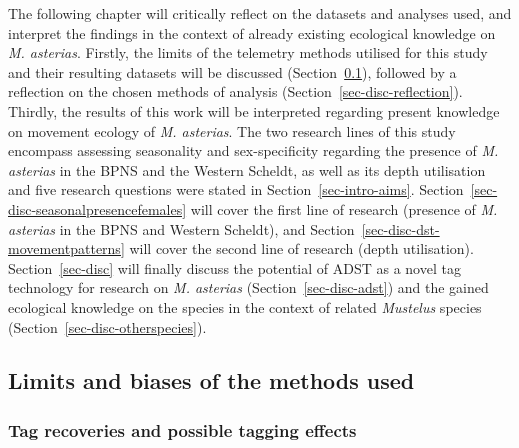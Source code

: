 \documentclass[
  authoryear,
  review,
  3p]{elsarticle}
\begin{document}
The following chapter will critically reflect on the datasets and
analyses used, and interpret the findings in the context of already
existing ecological knowledge on \emph{M. asterias}. Firstly, the limits
of the telemetry methods utilised for this study and their resulting
datasets will be discussed (Section~\ref{sec-disc-limits}), followed by
a reflection on the chosen methods of analysis
(Section~\ref{sec-disc-reflection}). Thirdly, the results of this work
will be interpreted regarding present knowledge on movement ecology of
\emph{M. asterias}. The two research lines of this study encompass
assessing seasonality and sex-specificity regarding the presence of
\emph{M. asterias} in the BPNS and the Western Scheldt, as well as its
depth utilisation and five research questions were stated in
Section~\ref{sec-intro-aims}.
Section~\ref{sec-disc-seasonalpresencefemales} will cover the first line
of research (presence of \emph{M. asterias} in the BPNS and Western
Scheldt), and Section~\ref{sec-disc-dst-movementpatterns} will cover the
second line of research (depth utilisation). Section~\ref{sec-disc} will
finally discuss the potential of ADST as a novel tag technology for
research on \emph{M. asterias} (Section~\ref{sec-disc-adst}) and the
gained ecological knowledge on the species in the context of related
\emph{Mustelus} species (Section~\ref{sec-disc-otherspecies}).

\hypertarget{sec-disc-limits}{%
\subsection{Limits and biases of the methods
used}\label{sec-disc-limits}}

\hypertarget{sec-disc-tagging-effects}{%
\subsubsection{Tag recoveries and possible tagging
effects}\label{sec-disc-tagging-effects}}
\end{document}
